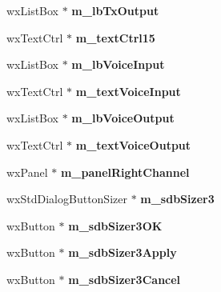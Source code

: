 \begin{DoxyCompactItemize}
\item 
\hypertarget{class_dlg_audio_a7a15f882dd0791867d7284cc4b043ca2}{wx\-List\-Box $\ast$ {\bfseries m\-\_\-lb\-Tx\-Output}}\label{class_dlg_audio_a7a15f882dd0791867d7284cc4b043ca2}

\item 
\hypertarget{class_dlg_audio_a860a5ec2c827f0c20db39660462eee4a}{wx\-Text\-Ctrl $\ast$ {\bfseries m\-\_\-text\-Ctrl15}}\label{class_dlg_audio_a860a5ec2c827f0c20db39660462eee4a}

\item 
\hypertarget{class_dlg_audio_a022070976a0bc9ffb78bea4298f759aa}{wx\-List\-Box $\ast$ {\bfseries m\-\_\-lb\-Voice\-Input}}\label{class_dlg_audio_a022070976a0bc9ffb78bea4298f759aa}

\item 
\hypertarget{class_dlg_audio_a900d174fd432c0e70d6f3fccd24e723b}{wx\-Text\-Ctrl $\ast$ {\bfseries m\-\_\-text\-Voice\-Input}}\label{class_dlg_audio_a900d174fd432c0e70d6f3fccd24e723b}

\item 
\hypertarget{class_dlg_audio_a75f209f62dd213b4236624f019f611e1}{wx\-List\-Box $\ast$ {\bfseries m\-\_\-lb\-Voice\-Output}}\label{class_dlg_audio_a75f209f62dd213b4236624f019f611e1}

\item 
\hypertarget{class_dlg_audio_a24ed8e4513996b1d938fbc6977d883a4}{wx\-Text\-Ctrl $\ast$ {\bfseries m\-\_\-text\-Voice\-Output}}\label{class_dlg_audio_a24ed8e4513996b1d938fbc6977d883a4}

\item 
\hypertarget{class_dlg_audio_a3094036ccbb10b69ae53be1989416cc1}{wx\-Panel $\ast$ {\bfseries m\-\_\-panel\-Right\-Channel}}\label{class_dlg_audio_a3094036ccbb10b69ae53be1989416cc1}

\item 
\hypertarget{class_dlg_audio_aa2834821c2fcae88fbedf3abfb9d69e0}{wx\-Std\-Dialog\-Button\-Sizer $\ast$ {\bfseries m\-\_\-sdb\-Sizer3}}\label{class_dlg_audio_aa2834821c2fcae88fbedf3abfb9d69e0}

\item 
\hypertarget{class_dlg_audio_a81c75edcacae099633853ee775d72de9}{wx\-Button $\ast$ {\bfseries m\-\_\-sdb\-Sizer3\-O\-K}}\label{class_dlg_audio_a81c75edcacae099633853ee775d72de9}

\item 
\hypertarget{class_dlg_audio_a2a6d0fffd35e01a0b59c22164625e6c3}{wx\-Button $\ast$ {\bfseries m\-\_\-sdb\-Sizer3\-Apply}}\label{class_dlg_audio_a2a6d0fffd35e01a0b59c22164625e6c3}

\item 
\hypertarget{class_dlg_audio_a749b04f8606ba939394d75267f8003ce}{wx\-Button $\ast$ {\bfseries m\-\_\-sdb\-Sizer3\-Cancel}}\label{class_dlg_audio_a749b04f8606ba939394d75267f8003ce}

\end{DoxyCompactItemize}



